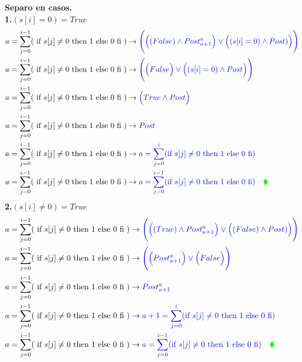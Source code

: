 \documentclass[a4paper]{article}
\begin{document}
\begin{enumerate}
   		\textbf{Separo en casos.}\medskip \\
   		\textbf{1.}$(s[i]=0)=True$\\
   		\begin{align*}
   		a=\sum_{j=0}^{i-1}(\textrm{ if }s[j] \neq 0 
    \textrm{ then 1 else 0 fi }) &\rightarrow \color{blue} \Bigg(\Big((False)\wedge
   				Post_{a+1}^{a}\Big) \vee \Big((s[i] = 0)\wedge Post)\Big)\Bigg)\\
   		a=\sum_{j=0}^{i-1}(\textrm{ if }s[j] \neq 0 
    \textrm{ then 1 else 0 fi }) &\rightarrow \color{blue} \Bigg(\Big(False\Big) \vee \Big((s[i] = 0)\wedge Post\Big)\Bigg)\\
   		a=\sum_{j=0}^{i-1}(\textrm{ if }s[j] \neq 0 
    \textrm{ then 1 else 0 fi }) &\rightarrow \color{blue} \Big(True\wedge Post\Big)\\
    	a=\sum_{j=0}^{i-1}(\textrm{ if }s[j] \neq 0 
    \textrm{ then 1 else 0 fi }) &\rightarrow \color{blue} Post\\
    	a=\sum_{j=0}^{i-1}(\textrm{ if }s[j] \neq 0 
    \textrm{ then 1 else 0 fi }) &\rightarrow \color{blue} a=\sum_{j=0}^{i}(\textrm{if }s[j] \neq 0
    \textrm{ then 1 else 0 fi})\\
    a=\sum_{j=0}^{i-1}(\textrm{ if }s[j] \neq 0 
    \textrm{ then 1 else 0 fi }) &\rightarrow \color{blue} a=\sum_{j=0}^{i-1}(\textrm{if }s[j] \neq 0
    \textrm{ then 1 else 0 fi})\quad\color{green}\blacklozenge\\
		\end{align*}
\textbf{2.}$(s[i]\neq 0)=True$\\
   		\begin{align*}
   		a=\sum_{j=0}^{i-1}(\textrm{ if }s[j] \neq 0 
    \textrm{ then 1 else 0 fi }) &\rightarrow \color{blue} \Bigg(\Big((True)\wedge
   				Post_{a+1}^{a}\Big) \vee \Big((False)\wedge Post)\Big)\Bigg)\\
   		a=\sum_{j=0}^{i-1}(\textrm{ if }s[j] \neq 0 
    \textrm{ then 1 else 0 fi }) &\rightarrow \color{blue} \Bigg(\Big(Post_{a+1}^{a}\Big) \vee \Big(False\Big)\Bigg)\\
    a=\sum_{j=0}^{i-1}(\textrm{ if }s[j] \neq 0
    \textrm{ then 1 else 0 fi }) &\rightarrow \color{blue} Post_{a+1}^{a}\\
    	a=\sum_{j=0}^{i-1}(\textrm{ if }s[j] \neq 0 
    \textrm{ then 1 else 0 fi }) &\rightarrow \color{blue} a+1=\sum_{j=0}^{i}(\textrm{if }s[j] \neq 0
    \textrm{ then 1 else 0 fi})\\
    a=\sum_{j=0}^{i-1}(\textrm{ if }s[j] \neq 0 
    \textrm{ then 1 else 0 fi }) &\rightarrow \color{blue} a=\sum_{j=0}^{i-1}(\textrm{if }s[j] \neq 0
    \textrm{ then 1 else 0 fi})\quad\color{green}\blacklozenge\\
		\end{align*}
	
\end{enumerate}
\end{document}
